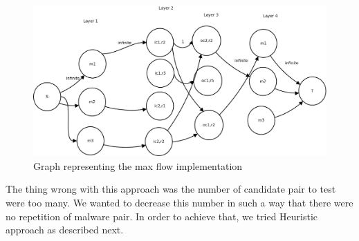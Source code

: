 \begin{figure}[h]
  \centering
  \includegraphics[scale=0.23]{figures/maxflow.png}
  \caption[Max Flow]{Graph representing the max flow implementation}\label{fig:maxflow}
\end{figure}
The thing wrong with this approach was the number of candidate pair to test were too many.
We wanted to decrease this number in such a way that there were no repetition of malware pair.
In order to achieve that, we tried Heuristic approach as described next.
